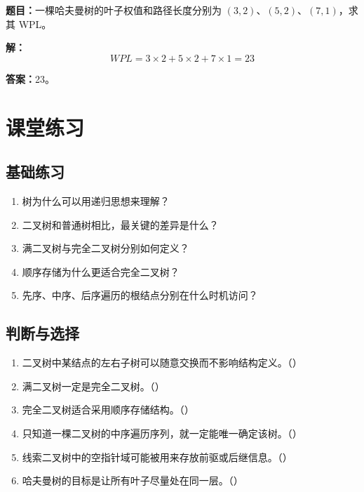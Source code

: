 \documentclass{../../note}
\begin{document}
\textbf{题目：}一棵哈夫曼树的叶子权值和路径长度分别为 $(3,2)$、$(5,2)$、$(7,1)$，求其 WPL。

\textbf{解：}
\[
WPL = 3 \times 2 + 5 \times 2 + 7 \times 1 = 23
\]

\textbf{答案：}23。

\section{课堂练习}

\subsection{基础练习}

\begin{enumerate}
  \item 树为什么可以用递归思想来理解？
  \item 二叉树和普通树相比，最关键的差异是什么？
  \item 满二叉树与完全二叉树分别如何定义？
  \item 顺序存储为什么更适合完全二叉树？
  \item 先序、中序、后序遍历的根结点分别在什么时机访问？
\end{enumerate}

\subsection{判断与选择}

\begin{enumerate}
  \item 二叉树中某结点的左右子树可以随意交换而不影响结构定义。（\hspace{1cm}）
  \item 满二叉树一定是完全二叉树。（\hspace{1cm}）
  \item 完全二叉树适合采用顺序存储结构。（\hspace{1cm}）
  \item 只知道一棵二叉树的中序遍历序列，就一定能唯一确定该树。（\hspace{1cm}）
  \item 线索二叉树中的空指针域可能被用来存放前驱或后继信息。（\hspace{1cm}）
  \item 哈夫曼树的目标是让所有叶子尽量处在同一层。（\hspace{1cm}）
\end{enumerate}
\end{document}
